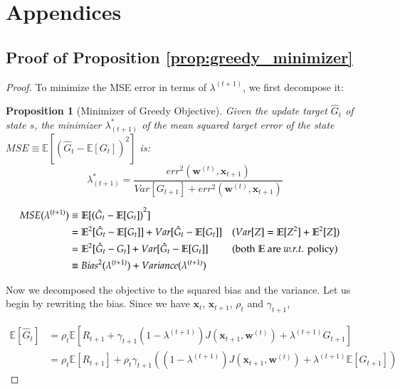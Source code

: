\documentclass{article}
\newcommand\wrt{\textit{w.r.t.}}
\newcommand\doubleE{\mathbb{E}}
\newtheorem{proposition}{Proposition}[section]
\begin{document}
\section*{Appendices}
\subsection{Proof of Proposition \ref{prop:greedy_minimizer}}
\begin{proof}
To minimize the MSE error in terms of $\lambda^{(t+1)}$, we first decompose it:
\begin{proposition}[Minimizer of Greedy Objective]
Given the update target $\hat{G}_t$ of state $s$, the minimizer $\lambda_{(t+1)}^*$ of the mean squared target error of the state
$MSE \equiv \doubleE[{(\hat{G}_t - \doubleE[G_t])}^2]$ is:
\begin{equation}
\lambda_{(t+1)}^* = \frac{{err}^2(\bm{w}^{(t)}, \bm{x}_{t+1})}{Var[G_{t+1}] + {err}^2(\bm{w}^{(t)}, \bm{x}_{t+1})}
\end{equation}
\end{proposition}

\begin{equation}
\begin{aligned}
MSE(\lambda^{(t+1)}) & \equiv \doubleE[{(\hat{G}_t - \doubleE[G_t])}^2]\\
& = \doubleE^2[\hat{G}_t - \doubleE[G_t]] + Var[\hat{G}_t - \doubleE[G_t]] && \text{($Var[Z] = \doubleE[Z^2] + \doubleE^2[Z]$)}\\
& = \doubleE^2[\hat{G}_t - G_t] + Var[\hat{G}_t - \doubleE[G_t]] && \text{(both $\doubleE$ are \wrt{} policy)}\\
& \equiv {Bias}^2(\lambda^{(t+1)}) + {Variance}(\lambda^{(t+1)})
\end{aligned}
\end{equation}

Now we decomposed the objective to the squared bias and the variance. Let us begin by rewriting the bias. Since we have $\bm{x}_t$, $\bm{x}_{t+1}$, $\rho_t$ and $\gamma_{t+1}$,

\begin{equation}
\begin{aligned}
\doubleE[\hat{G}_t] & = \rho_t \doubleE[R_{t+1} + \gamma_{t+1}(1-\lambda^{(t+1)})J(\bm{x}_{t+1}, \bm{w}^{(t)}) + \lambda^{(t+1)} G_{t+1}]\\
& = \rho_t \doubleE[R_{t+1}] + \rho_t \gamma_{t+1} \left((1-\lambda^{(t+1)})J(\bm{x}_{t+1}, \bm{w}^{(t)}) + \lambda^{(t+1)} \doubleE[G_{t+1}]\right)
\end{aligned}
\end{equation}


\end{proof}
\end{document}
